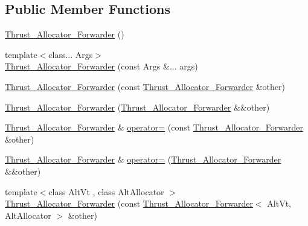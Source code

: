 \subsection*{Public Member Functions}
\begin{DoxyCompactItemize}
\item 
\hyperlink{structbc_1_1allocators_1_1Thrust__Allocator__Forwarder_a1029d052cf656bbdd7f3cb48fd37494e}{Thrust\+\_\+\+Allocator\+\_\+\+Forwarder} ()
\item 
{\footnotesize template$<$class... Args$>$ }\\\hyperlink{structbc_1_1allocators_1_1Thrust__Allocator__Forwarder_abd9edf3cb0167ce7ff2f06b7ac27b03c}{Thrust\+\_\+\+Allocator\+\_\+\+Forwarder} (const Args \&... args)
\item 
\hyperlink{structbc_1_1allocators_1_1Thrust__Allocator__Forwarder_af1fb55a0630615c5451b303e5347811e}{Thrust\+\_\+\+Allocator\+\_\+\+Forwarder} (const \hyperlink{structbc_1_1allocators_1_1Thrust__Allocator__Forwarder}{Thrust\+\_\+\+Allocator\+\_\+\+Forwarder} \&other)
\item 
\hyperlink{structbc_1_1allocators_1_1Thrust__Allocator__Forwarder_a04b641f81889bd88c31f999a09f84ff9}{Thrust\+\_\+\+Allocator\+\_\+\+Forwarder} (\hyperlink{structbc_1_1allocators_1_1Thrust__Allocator__Forwarder}{Thrust\+\_\+\+Allocator\+\_\+\+Forwarder} \&\&other)
\item 
\hyperlink{structbc_1_1allocators_1_1Thrust__Allocator__Forwarder}{Thrust\+\_\+\+Allocator\+\_\+\+Forwarder} \& \hyperlink{structbc_1_1allocators_1_1Thrust__Allocator__Forwarder_ad4787c514cb7472361fb3b1f00294e10}{operator=} (const \hyperlink{structbc_1_1allocators_1_1Thrust__Allocator__Forwarder}{Thrust\+\_\+\+Allocator\+\_\+\+Forwarder} \&other)
\item 
\hyperlink{structbc_1_1allocators_1_1Thrust__Allocator__Forwarder}{Thrust\+\_\+\+Allocator\+\_\+\+Forwarder} \& \hyperlink{structbc_1_1allocators_1_1Thrust__Allocator__Forwarder_a285d08cd74d4d45a3892dad8b6f29dcb}{operator=} (\hyperlink{structbc_1_1allocators_1_1Thrust__Allocator__Forwarder}{Thrust\+\_\+\+Allocator\+\_\+\+Forwarder} \&\&other)
\item 
{\footnotesize template$<$class Alt\+Vt , class Alt\+Allocator $>$ }\\\hyperlink{structbc_1_1allocators_1_1Thrust__Allocator__Forwarder_a545bf2ea00f2e13ab1825568b4b57f44}{Thrust\+\_\+\+Allocator\+\_\+\+Forwarder} (const \hyperlink{structbc_1_1allocators_1_1Thrust__Allocator__Forwarder}{Thrust\+\_\+\+Allocator\+\_\+\+Forwarder}$<$ Alt\+Vt, Alt\+Allocator $>$ \&other)

\end{DoxyCompactItemize}
